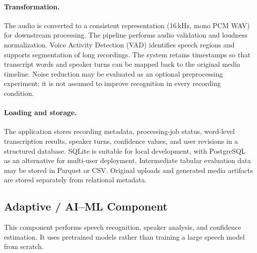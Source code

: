 \documentclass[11pt,a4paper]{article}
\begin{document}
\paragraph{Transformation.}
The audio is converted to a consistent representation (16\,kHz, mono PCM WAV)
for downstream processing. The pipeline performs audio validation and
loudness normalization. Voice Activity Detection (VAD) identifies speech
regions and supports segmentation of long recordings. The system retains
timestamps so that transcript words and speaker turns can be mapped back to
the original media timeline. Noise reduction may be evaluated as an optional
preprocessing experiment; it is not assumed to improve recognition in every
recording condition.

\paragraph{Loading and storage.}
The application stores recording metadata, processing-job status, word-level
transcription results, speaker turns, confidence values, and user revisions
in a structured database. SQLite is suitable for local development, with
PostgreSQL as an alternative for multi-user deployment. Intermediate
tabular evaluation data may be stored in Parquet or CSV. Original uploads
and generated media artifacts are stored separately from relational metadata.


\subsection{Adaptive / AI--ML Component}

This component performs speech recognition, speaker analysis, and
confidence estimation. It uses pretrained models rather than training a
large speech model from scratch.
\end{document}
